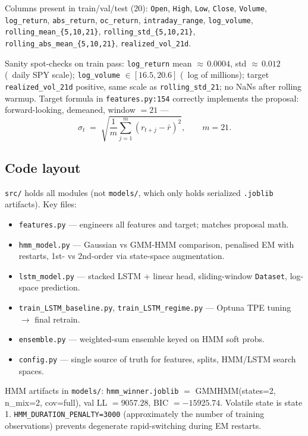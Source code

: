 \documentclass[11pt]{article}
\begin{document}
Columns present in train/val/test (20): \texttt{Open}, \texttt{High}, \texttt{Low}, \texttt{Close}, \texttt{Volume}, \texttt{log\_return}, \texttt{abs\_return}, \texttt{oc\_return}, \texttt{intraday\_range}, \texttt{log\_volume}, \texttt{rolling\_mean\_\{5,10,21\}}, \texttt{rolling\_std\_\{5,10,21\}}, \texttt{rolling\_abs\_mean\_\{5,10,21\}}, \texttt{realized\_vol\_21d}.

Sanity spot-checks on train pass: \texttt{log\_return} mean ${\approx}\,0.0004$, std ${\approx}\,0.012$ (\checkmark\ daily SPY scale); \texttt{log\_volume} $\in [16.5, 20.6]$ (\checkmark\ log of millions); target \texttt{realized\_vol\_21d} positive, same scale as \texttt{rolling\_std\_21}; no NaNs after rolling warmup. Target formula in \texttt{features.py:154} correctly implements the proposal: forward-looking, demeaned, window $=21$ ---
\[
\sigma_t \;=\; \sqrt{\frac{1}{m}\sum_{j=1}^{m} (r_{t+j} - \bar{r})^2}, \qquad m=21.
\]

\subsection*{Code layout}

\texttt{src/} holds all modules (not \texttt{models/}, which only holds serialized \texttt{.joblib} artifacts). Key files:

\begin{itemize}[leftmargin=*]
  \item \texttt{features.py} --- engineers all features and target; matches proposal math.
  \item \texttt{hmm\_model.py} --- Gaussian vs GMM-HMM comparison, penalised EM with restarts, 1st- vs 2nd-order via state-space augmentation.
  \item \texttt{lstm\_model.py} --- stacked LSTM + linear head, sliding-window \texttt{Dataset}, log-space prediction.
  \item \texttt{train\_LSTM\_baseline.py}, \texttt{train\_LSTM\_regime.py} --- Optuna TPE tuning $\to$ final retrain.
  \item \texttt{ensemble.py} --- weighted-sum ensemble keyed on HMM soft probs.
  \item \texttt{config.py} --- single source of truth for features, splits, HMM/LSTM search spaces.
\end{itemize}

HMM artifacts in \texttt{models/}: \texttt{hmm\_winner.joblib} $=$ GMMHMM(states=2, n\_mix=2, cov=full), val LL $= 9057.28$, BIC $= -15925.74$. Volatile state is state 1. \texttt{HMM\_DURATION\_PENALTY=3000} (approximately the number of training observations) prevents degenerate rapid-switching during EM restarts.
\end{document}
